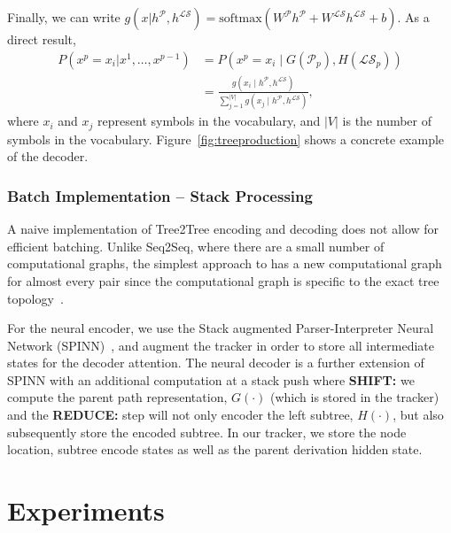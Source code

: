 \documentclass{article}
\newcommand{\jcs}[1]{\noindent{\textcolor{green}{\{{\bf jcs:} {\em #1}\}}}}
\begin{document}
Finally, we can write $g(x|h^{\mathcal{P}}, h^{\mathcal{LS}}) = \mathrm{softmax}(W^{\mathcal{P}}h^{\mathcal{P}} + W^{\mathcal{LS}}h^{\mathcal{LS}} + b)$. 
As a direct result, 
\begin{align*}
P(x^p=x_i|x^1,\ldots,x^{p-1}) &= P(x^p=x_i \mid G(\mathcal{P}_p), H(\mathcal{LS}_p)) \\
&=  \frac{g(x_i \mid  h^{\mathcal{P}}, h^{\mathcal{LS}})}{\sum_{j=1}^{|V|}{g(x_j \mid  h^{\mathcal{P}}, h^{\mathcal{LS}})}},
\end{align*}
where $x_i$ and $x_j$ represent symbols in the vocabulary, and $|V|$ is the number of symbols in the vocabulary. Figure~\ref{fig:treeproduction} shows a concrete example of the decoder.

\subsubsection{Batch Implementation -- Stack Processing}

A naive implementation of Tree2Tree encoding and decoding does not allow for efficient batching. Unlike Seq2Seq, where there are a small number of computational graphs, the simplest approach to has a new computational graph for almost every pair since the computational graph is specific to the exact tree topology~\citep{bowman2016fast,dyer2016recurrent,looks2017deep}. 

For the neural encoder, we use the Stack augmented
Parser-Interpreter Neural Network (SPINN)~\citep{bowman2016fast}, and augment the tracker in order to store all intermediate states for the decoder attention. The neural decoder is a further extension of SPINN with an additional computation at a stack push where {\bf SHIFT:} we compute the parent path representation, $G(\cdot)$ (which is stored in the tracker) and the {\bf REDUCE:} step will not only encoder the left subtree, $H(\cdot)$, but also subsequently store the encoded subtree. In our tracker, we store the node location, subtree encode states as well as the parent derivation hidden state.

\jcs{Should I include a figure?}

\section{Experiments}
\end{document}
